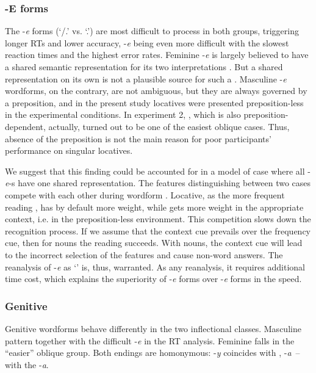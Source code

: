 \documentclass[output=paper, modfonts,newtxmath,hidelinks]{langscibook}
\begin{document}
\subsubsection{{-E forms}} 
The -\textit{e} forms (`\datt/\locc.\fem' vs. `\locc.\masc') are most difficult to process in both  groups, triggering longer RTs and lower accuracy,  -\textit{e} being even more difficult with the slowest reaction times and the highest error rates. Feminine -\textit{e} is largely believed to have a shared semantic representation for its two interpretations \citep{muller2004decomposing, wiese2004categories, wunderlich2004there}. But a shared representation on its own is not a plausible source for such a . Masculine -\textit{e} wordforms, on the contrary, are not ambiguous, but they are always governed by a preposition, and in the present study locatives were presented preposition-less in the experimental conditions. In experiment 2,  , which is also preposition-dependent, actually, turned out to be one of the easiest oblique cases. Thus, absence of the preposition is not the main reason for poor participants’ performance on singular  locatives. 

We suggest that this finding could be accounted for in a model of  case where all -\textit{e}-s have one shared representation. The features distinguishing between two cases compete with each other during wordform . Locative, as the more frequent reading \citep{samojlova2014frequencies}, has by default more weight, while  gets more weight in the appropriate context, i.e. in the preposition-less environment. This competition slows down the recognition process. If we assume that the context cue prevails over the frequency cue, then for  nouns the  reading succeeds. With  nouns, the context cue will lead to the incorrect selection of the  features and cause non-word answers. The reanalysis of -\textit{e} as `\locc' is, thus, warranted. As any reanalysis, it requires additional time cost, which explains the superiority of  -\textit{e} forms over  -\textit{e} forms in the  speed. 

\subsubsection{{Genitive}} 
Genitive wordforms behave differently in the two inflectional classes. Masculine   pattern together with the difficult -\textit{e} in the RT analysis. Feminine  falls in the “easier” oblique group. Both  endings are homonymous:   -\textit{y} coincides with  ,   -\textit{a}~\--- with the   -\textit{a}. 
\end{document}
